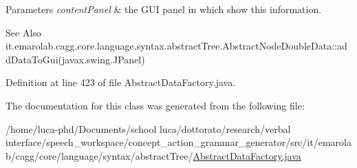 \begin{DoxyParams}{Parameters}
{\em content\-Panel} & the G\-U\-I panel in which show this information. \\
\hline
\end{DoxyParams}
\begin{DoxySeeAlso}{See Also}
it.\-emarolab.\-cagg.\-core.\-language.\-syntax.\-abstract\-Tree.\-Abstract\-Node\-Double\-Data\-::add\-Data\-To\-Gui(javax.\-swing.\-J\-Panel) 
\end{DoxySeeAlso}


Definition at line 423 of file Abstract\-Data\-Factory.\-java.



The documentation for this class was generated from the following file\-:\begin{DoxyCompactItemize}
\item 
/home/luca-\/phd/\-Documents/school luca/dottorato/research/verbal interface/speech\-\_\-workspace/concept\-\_\-action\-\_\-grammar\-\_\-generator/src/it/emarolab/cagg/core/language/syntax/abstract\-Tree/\hyperlink{AbstractDataFactory_8java}{Abstract\-Data\-Factory.\-java}\end{DoxyCompactItemize}
